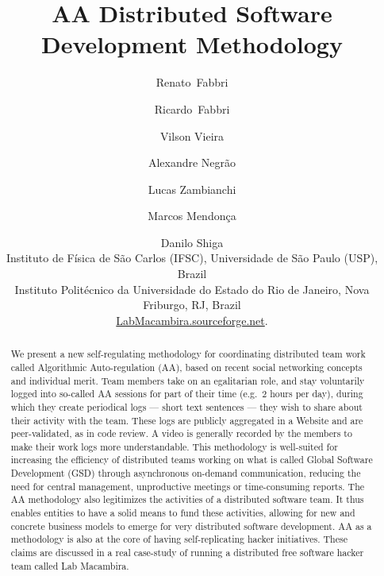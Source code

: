 \title{
AA Distributed Software Development Methodology
}

\author{%
Renato~Fabbri \and Ricardo~Fabbri \and Vilson Vieira \and Alexandre Negr\~{a}o \and Lucas Zambianchi
\and Marcos Mendon\c{c}a \and Danilo Shiga\\[1em]
\small{
Instituto de F\'{i}sica de S\~{a}o Carlos (IFSC), Universidade de
S\~{a}o Paulo (USP), Brazil}\\[1em]
\small{Instituto Polit\'{e}cnico da Universidade do Estado do Rio de
Janeiro, Nova Friburgo, RJ, Brazil}\\[1em]
\url{LabMacambira.sourceforge.net}.
}


\maketitle

\begin{abstract}
We present a new self-regulating methodology for coordinating
distributed team work called Algorithmic Auto-regulation (AA), based
on recent social networking concepts and individual merit. Team
members take on an egalitarian role, and stay voluntarily logged into
so-called AA sessions for part of their time (e.g.\ 2 hours per day),
during which they create periodical logs --- short text sentences ---
they wish to share about their activity with the team. These logs are
publicly aggregated in a Website and are peer-validated, as in code
review. A video is generally recorded by the members to make their
work logs more understandable. This methodology is well-suited for
increasing the efficiency of distributed teams working on what is
called Global Software Development (GSD) through asynchronous
on-demand communication, reducing the need for central management,
unproductive meetings or time-consuming reports. The AA methodology
also legitimizes the activities of a distributed software team.  It
thus enables entities to have a solid means to fund these activities,
allowing for new and concrete business models to emerge for very
distributed software development. AA as a methodology is also at the
core of having self-replicating hacker initiatives. These claims are
discussed in a real case-study of running a distributed free software
hacker team called Lab Macambira.
\end{abstract}

